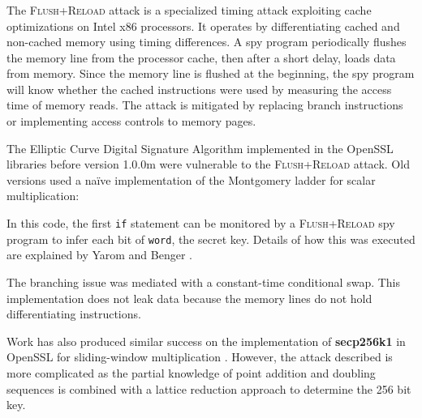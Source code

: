 \documentclass{article}
\begin{document}
\subsubsection{}
    The \textsc{Flush+Reload} attack \cite{yarom_falkner} is a specialized timing
    attack exploiting cache optimizations on Intel x86 processors.  It operates
    by differentiating cached and non-cached memory using timing differences. A
    spy program periodically flushes the memory line from the processor cache,
    then after a short delay, loads data from memory. Since the memory line is
    flushed at the beginning, the spy program will know whether the cached
    instructions were used by measuring the access time of memory reads. The
    attack is mitigated by replacing branch instructions or implementing access
    controls to memory pages.

    The Elliptic Curve Digital Signature Algorithm implemented in the OpenSSL
    libraries before version 1.0.0m were vulnerable to the \textsc{Flush+Reload}
    attack. Old versions used a na\"{i}ve implementation of the Montgomery ladder for
    scalar multiplication:
    \newpage
    
    In this code, the first \texttt{if} statement can be monitored by a
    \textsc{Flush+Reload} spy program to infer each bit of \texttt{word}, the
    secret key. Details of how this was executed are explained by Yarom and
    Benger \cite{yarom2014recovering}.

    The branching issue was mediated with a constant-time conditional swap.
    This implementation does not leak data because the memory lines do not hold
    differentiating instructions.
    

    Work has also produced similar success on the implementation of
    \textbf{secp256k1} in OpenSSL for sliding-window multiplication
    \cite{benger2014ooh}. However, the attack described is more complicated as
    the partial knowledge of point addition and doubling sequences is combined
    with a lattice reduction approach to determine the 256 bit key.
\end{document}
